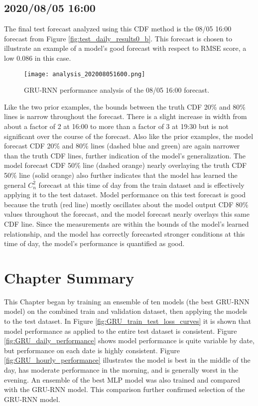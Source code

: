 \subsection{2020/08/05 16:00}
The final test forecast analyzed using this CDF method is the 08/05 16:00 forecast from Figure \ref{fig:test_daily_results0_b}. This forecast is chosen to illustrate an example of a model's good forecast with respect to RMSE score, a low 0.086 in this case.
\begin{figure}[h!]
	\centering
	\texttt{[image: analysis\_202008051600.png]}
	\caption{GRU-RNN performance analysis of the 08/05 16:00 forecast.}
	\label{fig:analysis_08051600}
\end{figure}
Like the two prior examples, the bounds between the truth CDF 20\% and 80\% lines is narrow throughout the forecast. There is a slight increase in width from about a factor of 2 at 16:00 to more than a factor of 3 at 19:30 but is not significant over the course of the forecast. Also like the prior examples, the model forecast CDF 20\% and 80\% lines (dashed blue and green) are again narrower than the truth CDF lines, further indication of the model's generalization. The model forecast CDF 50\% line (dashed orange) nearly overlaying the truth CDF 50\% line (solid orange) also further indicates that the model has learned the general $C_{n}^{2}$ forecast at this time of day from the train dataset and is effectively applying it to the test dataset. Model performance on this test forecast is good because the truth (red line) mostly oscillates about the model output CDF 80\% values throughout the forecast, and the model forecast nearly overlays this same CDF line. Since the measurements are within the bounds of the model's learned relationship, and the model has correctly forecasted stronger conditions at this time of day, the model's performance is quantified as good.

\section{Chapter Summary}
This Chapter began by training an ensemble of ten models (the best \ac{GRU-RNN} model) on the combined train and validation dataset, then applying the models to the test dataset. In Figure \ref{fig:GRU_train_test_loss_curves} it is shown that model performance as applied to the entire test dataset is consistent. Figure \ref{fig:GRU_daily_performance} shows model performance is quite variable by date, but performance on each date is highly consistent. Figure \ref{fig:GRU_hourly_performance} illustrates the model is best in the middle of the day, has moderate performance in the morning, and is generally worst in the evening. An ensemble of the best \ac{MLP} model was also trained and compared with the \ac{GRU-RNN} model. This comparison further confirmed selection of the \ac{GRU-RNN} model.

